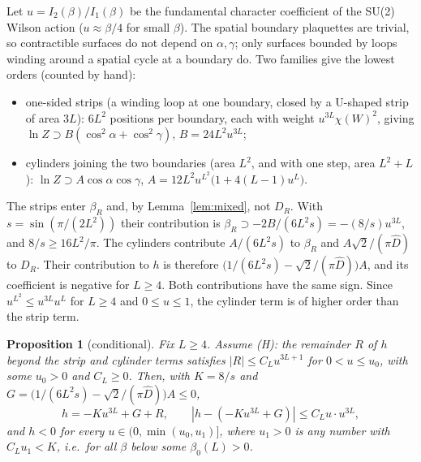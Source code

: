 \documentclass[11pt,a4paper]{article}
\newtheorem{proposition}[theorem]{Proposition}
\theoremstyle{definition}
\theoremstyle{remark}
\newcommand{\bR}{\beta_R}
\newcommand{\DR}{D_R}
\begin{document}
Let $u=I_2(\beta)/I_1(\beta)$ be the fundamental character coefficient of the SU(2) Wilson action ($u\approx\beta/4$ for small $\beta$). The spatial boundary plaquettes are trivial, so contractible surfaces do not depend on $\alpha,\gamma$; only surfaces bounded by loops winding around a spatial cycle at a boundary do. Two families give the lowest orders (counted by hand):
\begin{itemize}[leftmargin=2em]
\item one-sided strips (a winding loop at one boundary, closed by a U-shaped strip of area $3L$): $6L^2$ positions per boundary, each with weight $u^{3L}\chi(W)^2$, giving $\ln Z\supset B(\cos^2\alpha+\cos^2\gamma)$, $B=24L^2u^{3L}$;
\item cylinders joining the two boundaries (area $L^2$, and with one step, area $L^2+L$): $\ln Z\supset A\cos\alpha\cos\gamma$, $A=12L^2u^{L^2}\bigl(1+4(L-1)u^L\bigr)$.
\end{itemize}
The strips enter $\bR$ and, by Lemma~\ref{lem:mixed}, not $\DR$. With $s=\sin(\pi/(2L^2))$ their contribution is $\bR\supset-2B/(6L^2s)=-(8/s)u^{3L}$, and $8/s\ge16L^2/\pi$. The cylinders contribute $A/(6L^2s)$ to $\bR$ and $A\sqrt2/(\pi\hat D)$ to $\DR$. Their contribution to $h$ is therefore $\bigl(1/(6L^2s)-\sqrt2/(\pi\hat D)\bigr)A$, and its coefficient is negative for $L\ge4$. Both contributions have the same sign. Since $u^{L^2}\le u^{3L}u^L$ for $L\ge4$ and $0\le u\le1$, the cylinder term is of higher order than the strip term.

\begin{proposition}[conditional]\label{prop:strong}
Fix $L\ge4$. Assume (H): the remainder $R$ of $h$ beyond the strip and cylinder terms satisfies $|R|\le C_Lu^{3L+1}$ for $0<u\le u_0$, with some $u_0>0$ and $C_L\ge0$. Then, with $K=8/s$ and $G=\bigl(1/(6L^2s)-\sqrt2/(\pi\hat D)\bigr)A\le0$,
\[
h=-K u^{3L}+G+R,\qquad |h-(-Ku^{3L}+G)|\le C_Lu\cdot u^{3L},
\]
and $h<0$ for every $u\in(0,\min(u_0,u_1)]$, where $u_1>0$ is any number with $C_Lu_1<K$, i.e.\ for all $\beta$ below some $\beta_0(L)>0$.
\end{proposition}
\end{document}
